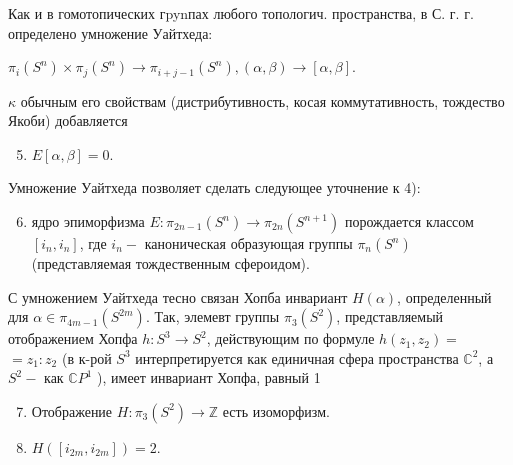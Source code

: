 \documentclass[10pt]{article}
\begin{document}
Как и в гомотопических гpynпах любого топологич. пространства, в С. г. г. определено умножение Уайтхеда:



$\pi_{i}\left(S^{n}\right) \times \pi_{j}\left(S^{n}\right) \longrightarrow \pi_{i+j-1}\left(S^{n}\right),(\alpha, \beta) \longrightarrow[\alpha, \beta]$.



$\kappa$ обычным его свойствам (дистрибутивность, косая коммутативность, тождество Якоби) добавляется



\begin{enumerate}

  \setcounter{enumi}{4}

  \item $E[\alpha, \beta]=0$.

\end{enumerate}



Умножение Уайтхеда позволяет сделать следующее уточнение к 4):



\begin{enumerate}

  \setcounter{enumi}{5}

  \item ядро эпиморфизма $E: \pi_{2 n-1}\left(S^{n}\right) \rightarrow \pi_{2 n}\left(S^{n+1}\right)$ порождается классом $\left[i_{n}, i_{n}\right]$, где $i_{n}-$ каноническая образующая группы $\pi_{n}\left(S^{n}\right)$ (представляемая тождественным сфероидом).

\end{enumerate}



С умножением Уайтхеда тесно связан Хопба инвариант $H(\alpha)$, определенный для $\alpha \in \pi_{4 m-1}\left(S^{2 m}\right)$. Так, элемевт группы $\pi_{3}\left(S^{2}\right)$, представляемый отображением Хопфа $h: S^{3} \rightarrow S^{2}$, действующим по формуле $h\left(z_{1}, z_{2}\right)=$ $=z_{1}: z_{2}$ (в к-рой $S^{3}$ интерпретируется как единичная сфера пространства $\mathbb{C}^{2}$, а $S^{2}-$ как $\mathbb{C} P^{1}$ ), имеет инвариант Хопфа, равный 1



\begin{enumerate}

  \setcounter{enumi}{6}

  \item Отображение $H: \pi_{3}\left(S^{2}\right) \rightarrow \mathbb{Z}$ есть изоморфизм.



  \item $H\left(\left[i_{2 m}, i_{2 m}\right]\right)=2$.



\end{enumerate}
\end{document}
